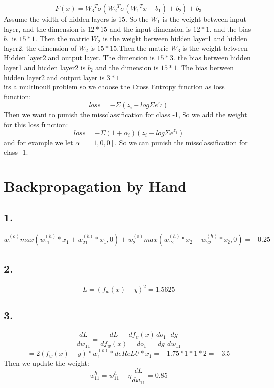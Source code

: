 \documentclass{article}
\begin{document}
\[F(x)={W_3}^T\sigma({W_2}^T\sigma({W_1}^Tx+b_1)+b_2)+b_3\]
Assume the width of hidden layers is 15.  So the $W_1$ is the weight between input layer, and the dimension is $12 * 15$ and the input dimension is $12 *1$. and the bias $b_1$ is $15 *1$.
Then the matric $W_2$ is the weight between hidden layer1 and hidden layer2. the dimension of $W_2$ is $15*15$.Then the matric $W_3$ is the weight between Hidden layer2 and output layer. The dimension is $15*3$.
the bias between hidden layer1 and hidden layer2 is $b_2$ and the dimension is $15*1$. The bias between hidden layer2 and output layer is $3*1$
\\ its a multinouli problem so we choose the Cross Entropy function as loss function:
\[loss=-\Sigma (z_i-log\Sigma e^{z_j})\]
Then we want to punish the missclassification for class -1, So we add the weight for this loss function:
\[loss=-\Sigma (1+\alpha_i) (z_i-log\Sigma e^{z_j})\]
and for example we let $\alpha=[1,0,0]$. So we can punish the missclassification for class -1.
\section{Backpropagation by Hand}
\subsection*{1.}
\[w_1^{(o)}max(w_{11}^{(h)}*x_1+w_{21}^{(h)}*x_1,0)+w_2^{(o)}max(w_{12}^{(h)}*x_2+w_{22}^{(h)}*x_2,0)=-0.25\]
\subsection*{2.}
\[L=(f_w(x)-y)^2=1.5625\]
\subsection*{3.}

\[\frac{dL}{dw_{11}}=\frac{dL}{df_w(x)}\frac{df_w(x)}{do_1}\frac{do_1}{dg}\frac{dg}{dw_{11}}\]
\[=2(f_w(x)-y)*w_1^{(o)}*deReLU*x_1=-1.75*1*1*2=-3.5\]
Then we update the weight:
\[w_{11}^{h}=w_{11}^{h}-\eta \frac{dL}{dw_{11}}=0.85\]
\end{document}

